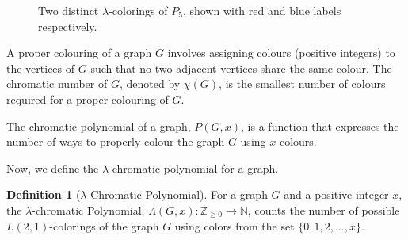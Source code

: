 \documentclass{birkjour}
\theoremstyle{definition}
\newtheorem{definition}[theorem]{Definition}
\theoremstyle{remark}
\numberwithin{equation}{section}
\begin{document}
\begin{figure}[h]
    \centering
    \caption{Two distinct $\lambda$-colorings of $P_5$, shown with red and blue labels respectively.}
    \label{F.111}
\end{figure}

A proper colouring of a graph \( G \) involves assigning colours (positive integers) to the vertices of \( G \) such that no two adjacent vertices share the same colour. The chromatic number of \( G \), denoted by \( \chi(G) \), is the smallest number of colours required for a proper colouring of \( G \).

The chromatic polynomial of a graph, \( P(G, x) \), is a function that expresses the number of ways to properly colour the graph \( G \) using \( x \) colours.


Now, we define the \(\lambda\)-chromatic polynomial for a graph.

\begin{definition}[$\lambda$-Chromatic Polynomial]
For a graph \( G \) and a positive integer \( x \), the \(\lambda\)-chromatic Polynomial, \( \Lambda(G, x): \mathbb{Z}_{\geq0} \longrightarrow \mathbb{N} \), counts the number of possible \( L(2, 1) \)-colorings of the graph \( G \) using colors from the set \( \{0, 1, 2, \dots, x\} \).
\end{definition}
\end{document}
